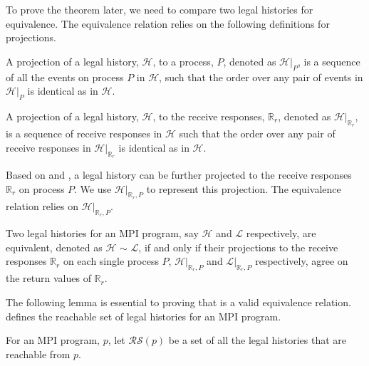 To prove the theorem later, we need to compare two legal histories for equivalence. The equivalence relation relies on the following definitions for projections.

\begin{definition}\label{def:projection_process}
A projection of a legal history, $\mathcal{H}$, to a process, $P$, denoted as $\mathcal{H} | _P$, is a sequence of all the events on process $P$ in $\mathcal{H}$, such that the order over any pair of events in $\mathcal{H} | _P$ is identical as in $\mathcal{H}$.
\end{definition}

\begin{definition}\label{def:projection_receive}
A projection of a legal history, $\mathcal{H}$, to the receive responses, $\mathbb{R}_r$, denoted as $\mathcal{H} | _{\mathbb{R}_r}$, is a sequence of receive responses in $\mathcal{H}$ such that the order over any pair of receive responses in $\mathcal{H} | _{\mathbb{R}_r}$ is identical as in $\mathcal{H}$.
\end{definition}

Based on  and , a legal history can be further projected to the receive responses $\mathbb{R}_r$ on process $P$. We use $\mathcal{H} | _{\mathbb{R}_r,P}$ to represent this projection. The equivalence relation relies on $\mathcal{H} | _{\mathbb{R}_r,P}$.

\begin{definition}\label{def:er}
Two legal histories for an MPI program, say $\mathcal{H}$ and $\mathcal{L}$ respectively, are equivalent, denoted as $\mathcal{H}$ $\sim$ $\mathcal{L}$, if and only if their projections to the receive responses $\mathbb{R}_r$ on each single process $P$, $\mathcal{H} | _{\mathbb{R}_r,P}$ and $\mathcal{L} | _{\mathbb{R}_r,P}$ respectively, agree on the return values of $\mathbb{R}_r$.
\end{definition}

The following lemma is essential to proving that  is a valid equivalence relation.  defines the reachable set of legal histories for an MPI program.

\begin{definition}\label{def:reachable}
For an MPI program, $\mathit{p}$, let $\mathcal{RS}(\mathit{p})$ be a set of all the legal histories that are reachable from $\mathit{p}$.
\end{definition}

